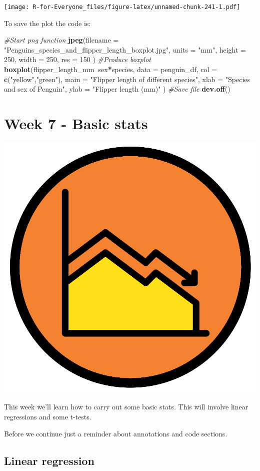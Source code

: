 \documentclass[]{book}
\newenvironment{Shaded}{\begin{snugshade}}{\end{snugshade}}
\newcommand{\KeywordTok}[1]{\textcolor[rgb]{0.13,0.29,0.53}{\textbf{#1}}}
\newcommand{\DataTypeTok}[1]{\textcolor[rgb]{0.13,0.29,0.53}{#1}}
\newcommand{\DecValTok}[1]{\textcolor[rgb]{0.00,0.00,0.81}{#1}}
\newcommand{\StringTok}[1]{\textcolor[rgb]{0.31,0.60,0.02}{#1}}
\newcommand{\CommentTok}[1]{\textcolor[rgb]{0.56,0.35,0.01}{\textit{#1}}}
\newcommand{\OperatorTok}[1]{\textcolor[rgb]{0.81,0.36,0.00}{\textbf{#1}}}
\newcommand{\NormalTok}[1]{#1}
\begin{document}
\texttt{[image: R-for-Everyone\_files/figure-latex/unnamed-chunk-241-1.pdf]}

To save the plot the code is:

\begin{Shaded}
\begin{Highlighting}[]
\CommentTok{#Start png function}
\KeywordTok{jpeg}\NormalTok{(}\DataTypeTok{filename =} \StringTok{"Penguins_species_and_flipper_length_boxplot.jpg"}\NormalTok{,}
    \DataTypeTok{units =} \StringTok{"mm"}\NormalTok{, }\DataTypeTok{height =} \DecValTok{250}\NormalTok{, }\DataTypeTok{width =} \DecValTok{250}\NormalTok{, }\DataTypeTok{res =} \DecValTok{150}\NormalTok{ )}
\CommentTok{#Produce boxplot}
\KeywordTok{boxplot}\NormalTok{(flipper_length_mm}\OperatorTok{~}\NormalTok{sex}\OperatorTok{*}\NormalTok{species,}
        \DataTypeTok{data =}\NormalTok{ penguin_df,}
        \DataTypeTok{col =} \KeywordTok{c}\NormalTok{(}\StringTok{"yellow"}\NormalTok{,}\StringTok{"green"}\NormalTok{),}
        \DataTypeTok{main =} \StringTok{"Flipper length of different species"}\NormalTok{,}
        \DataTypeTok{xlab =} \StringTok{"Species and sex of Penguin"}\NormalTok{,}
        \DataTypeTok{ylab =} \StringTok{"Flipper length (mm)"}
\NormalTok{)}
\CommentTok{#Save file}
\KeywordTok{dev.off}\NormalTok{()}
\end{Highlighting}
\end{Shaded}

\chapter{Week 7 - Basic stats}\label{week-7---basic-stats}

\begin{center}\includegraphics[width=0.2\linewidth]{figures/basic_stats} \end{center}

This week we'll learn how to carry out some basic stats. This will
involve linear regressions and some t-tests.

Before we continue just a reminder about annotations and code sections.

\section{Linear regression}\label{linear-regression}
\end{document}
